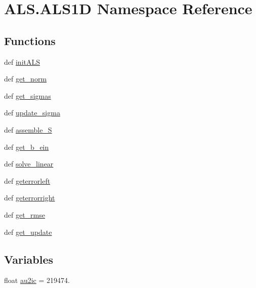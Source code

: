 \hypertarget{namespace_a_l_s_1_1_a_l_s1_d}{\section{A\+L\+S.\+A\+L\+S1\+D Namespace Reference}
\label{namespace_a_l_s_1_1_a_l_s1_d}
}
\subsection*{Functions}
\begin{DoxyCompactItemize}
\item 
def \hyperlink{namespace_a_l_s_1_1_a_l_s1_d_a32c360de0d2968c3420aba6db27aab03}{init\+A\+L\+S}
\item 
def \hyperlink{namespace_a_l_s_1_1_a_l_s1_d_a2fd6554e1ae1c9cb742260746fd46bcb}{get\+\_\+norm}
\item 
def \hyperlink{namespace_a_l_s_1_1_a_l_s1_d_ac420366e2c70d0554cf7a8fde0b93e3e}{get\+\_\+sigmas}
\item 
def \hyperlink{namespace_a_l_s_1_1_a_l_s1_d_a994f6e3fde98eeeeb090fd856c2e4844}{update\+\_\+sigma}
\item 
def \hyperlink{namespace_a_l_s_1_1_a_l_s1_d_a36b5c4ceb1ab2bd22d085716e5cf18f4}{assemble\+\_\+\+S}
\item 
def \hyperlink{namespace_a_l_s_1_1_a_l_s1_d_ac09997ab1bf46477a1a0c4e5cb8411b8}{get\+\_\+b\+\_\+ein}
\item 
def \hyperlink{namespace_a_l_s_1_1_a_l_s1_d_a964d2ee3d2fa472027342adbb4fa7c2e}{solve\+\_\+linear}
\item 
def \hyperlink{namespace_a_l_s_1_1_a_l_s1_d_a0e620f84229f80936a74dadc3ab16675}{geterrorleft}
\item 
def \hyperlink{namespace_a_l_s_1_1_a_l_s1_d_af57f376f29c970d07bcb4ae6d4b287fe}{geterrorright}
\item 
def \hyperlink{namespace_a_l_s_1_1_a_l_s1_d_a49e8fa6e552e24a4ce1b92168d08933a}{get\+\_\+rmse}
\item 
def \hyperlink{namespace_a_l_s_1_1_a_l_s1_d_a9eaea1906f96507bb770b52ebbe77c82}{get\+\_\+update}
\end{DoxyCompactItemize}
\subsection*{Variables}
\begin{DoxyCompactItemize}
\item 
float \hyperlink{namespace_a_l_s_1_1_a_l_s1_d_a6225364b4130ce75f06fc87c2741007f}{au2ic} = 219474.
\end{DoxyCompactItemize}


